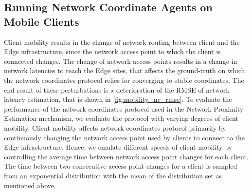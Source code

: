 \subsection{Running Network Coordinate Agents on Mobile Clients}
Client mobility results in the change of network routing between client and the Edge infrastructure, since the network access point to which the client is connected changes. The change of network access points results in a change in network latencies to reach the Edge sites, that affects the ground-truth on which the network coordinates protocol relies for converging to stable coordinates. The end result of these perturbations is a deterioration of the RMSE of network latency estimation, that is shown in \cref{fig:mobility_nc_rmse}. To evaluate the performance of the network coordinates protocol used in the Network Proximity Estimation mechanism, we evaluate the protocol with varying degrees of client mobility. Client mobility affects network coordinates protocol primarily by continuously changing the network access point used by clients to connect to the Edge infrastructure. Hence, we emulate different speeds of client mobility by controlling the average time between network access point changes for each client. The time between two consecutive access point changes for a client is sampled from an exponential distribution with the mean of the distribution set as mentioned above.
